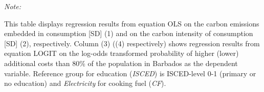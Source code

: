 \begin{table}[htbp!]
\begin{adjustbox}{width = 1\textwidth, max height = 0.95\textheight, center}
\begin{threeparttable}[b]
         \begin{tablenotes}\item \medskip \textit{Note:}
            \item This table displays regression results from equation OLS on the carbon emissions embedded in consumption [SD] (1) and on the carbon intensity of consumption [SD] (2), respectively. 
                                      Column (3) ((4) respectively) shows regression results from equation LOGIT on the log-odds transformed probability of higher (lower) additional costs than 80\% of the population in Barbados as the dependent variable. Reference group for education (\textit{ISCED}) is ISCED-level 0-1 (primary or no education) and \textit{Electricity} for cooking fuel (\textit{CF}).
         \end{tablenotes}
      \end{threeparttable}
   \end{adjustbox}
\end{table}



